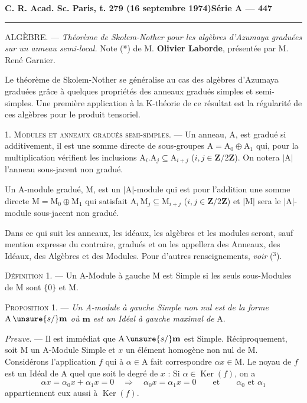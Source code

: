 \textbf{C. R. Acad. Sc. Paris, t. 279 (16 septembre 1974)}\hfill\textbf{Série A — 447}

\rule{\linewidth}{0.4pt}

ALGÈBRE. — \emph{Théorème de Skolem-Nother pour les algèbres d'Azumaya
graduées sur un anneau semi-local.} Note (*) de M. \textbf{Olivier Laborde},
présentée par M. René Garnier.

Le théorème de Skolem-Nother se généralise au cas des algèbres d'Azumaya graduées grâce
à quelques propriétés des anneaux gradués simples et semi-simples. Une première application
à la K-théorie de ce résultat est la régularité de ces algèbres pour le produit tensoriel.

1. \textsc{Modules et anneaux gradués semi-simples}. — Un anneau, A, est gradué si additivement,
il est une somme directe de sous-groupes $\mathrm A=\mathrm A_0\oplus\mathrm A_1$ qui, pour la multiplication
vérifient les inclusions $\mathrm A_i.\mathrm A_j\subseteq\mathrm A_{i+j}$ ($i,j\in\mathbf Z/2\mathbf Z$). On notera $|\mathrm A|$ l'anneau sous-jacent
non gradué.

Un A-module gradué, M, est un $|\mathrm A|$-module qui est pour l'addition une somme directe
$\mathrm M=\mathrm M_0\oplus\mathrm M_1$ qui satisfait $\mathrm A_i\,\mathrm M_j\subseteq\mathrm M_{i+j}$ ($i,j\in\mathbf Z/2\mathbf Z$) et $|\mathrm M|$ sera le $|\mathrm A|$-module
sous-jacent non gradué.

Dans ce qui suit les anneaux, les idéaux, les algèbres et les modules seront, sauf mention
expresse du contraire, gradués et on les appellera des Anneaux, des Idéaux, des Algèbres
et des Modules. Pour d'autres renseignements, \emph{voir} (${}^3$).

\textsc{Définition 1}. — Un A-Module à gauche M est Simple si les seuls sous-Modules de M
sont $\{0\}$ et M.

\textsc{Proposition 1}. — \emph{Un A-module à gauche Simple non nul est de la forme
$\mathrm A\,\unsure{s/}\mathbf m$ où $\mathbf m$
est un Idéal à gauche maximal de} A.

\emph{Preuve}. — Il est immédiat que $\mathrm A\,\unsure{s/}\mathbf m$ est Simple. Réciproquement, soit M un A-Module
Simple et $x$ un élément homogène non nul de M. Considérons l'application $f$ qui à $\alpha\in\mathrm A$
fait correspondre $\alpha x\in\mathrm M$. Le noyau de $f$ est un Idéal de A quel que soit le degré de $x$ :
Si $\alpha\in\operatorname{Ker}(f)$, on a
\[
\alpha x=\alpha_0x+\alpha_1x=0\quad\Rightarrow\quad\alpha_0x=\alpha_1x=0
\qquad\text{et}\qquad\alpha_0\text{ et }\alpha_1
\]
appartiennent eux aussi à $\operatorname{Ker}(f)$.

